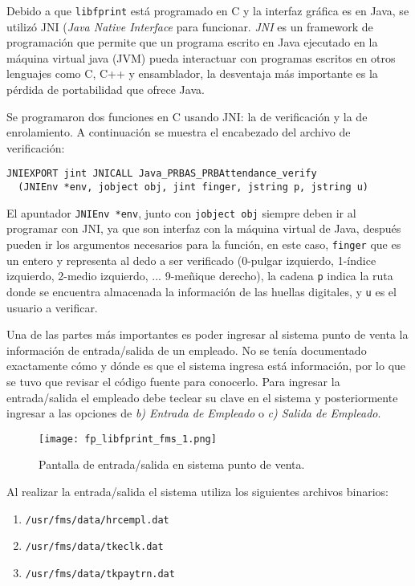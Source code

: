 Debido a que \texttt{libfprint} está programado en C y la interfaz gráfica es en Java, se utilizó JNI (\textit{Java Native Interface} para funcionar. \textit{JNI} es un framework de programación que permite que un programa escrito en Java ejecutado en la máquina virtual java (JVM) pueda interactuar con programas escritos en otros lenguajes como C, C++ y ensamblador, la desventaja más importante es la pérdida de portabilidad que ofrece Java.

Se programaron dos funciones en C usando JNI: la de verificación y la de enrolamiento. A continuación se muestra el encabezado del archivo de verificación:

\begin{Verbatim}
JNIEXPORT jint JNICALL Java_PRBAS_PRBAttendance_verify
  (JNIEnv *env, jobject obj, jint finger, jstring p, jstring u)
\end{Verbatim}

El apuntador \texttt{JNIEnv *env}, junto con \texttt{jobject obj} siempre deben ir al programar con JNI, ya que son interfaz con la máquina virtual de Java, después pueden ir los argumentos necesarios para la función, en este caso, \texttt{finger} que es un entero y representa al dedo a ser verificado (0-pulgar izquierdo, 1-índice izquierdo, 2-medio izquierdo, ... 9-meñique derecho), la cadena \texttt{p} indica la ruta donde se encuentra almacenada la información de las huellas digitales, y \texttt{u} es el usuario a verificar.

Una de las partes más importantes es poder ingresar al sistema punto de venta la información de entrada/salida de un empleado. No se tenía documentado exactamente cómo y dónde es que el sistema ingresa está información, por lo que se tuvo que revisar el código fuente para conocerlo. Para ingresar la entrada/salida el empleado debe teclear su clave en el sistema y posteriormente ingresar a las opciones de \textit{b) Entrada de Empleado} o \textit{c) Salida de Empleado}.

\begin{figure}[htb]
 \begin{center}
  \texttt{[image: fp\_libfprint\_fms\_1.png]}
 \end{center}
 \caption{Pantalla de entrada/salida en sistema punto de venta.}
 \label{fig:finger_print_4}
\end{figure}

Al realizar la entrada/salida el sistema utiliza los siguientes archivos binarios: 

\begin{enumerate}
 \item \texttt{/usr/fms/data/hrcempl.dat}
 \item \texttt{/usr/fms/data/tkeclk.dat}
 \item \texttt{/usr/fms/data/tkpaytrn.dat}
\end{enumerate}


